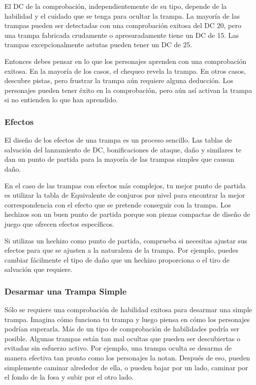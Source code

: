\documentclass[a4paper,twocolumn,openany,10pt]{dndbook}
\begin{document}
El DC de la comprobación, independientemente de su tipo, depende de la habilidad y el cuidado que se tenga para ocultar la
trampa. La mayoría de las trampas pueden ser detectadas con una comprobación exitosa del DC 20, pero una trampa fabricada
crudamente o apresuradamente tiene un DC de 15. Las trampas excepcionalmente astutas pueden tener un DC de 25.

Entonces debes pensar en lo que los personajes aprenden con una comprobación exitosa. En la mayoría de los casos, el chequeo
revela la trampa. En otros casos, descubre pistas, pero frustrar la trampa aún requiere alguna deducción. Los personajes pueden
tener éxito en la comprobación, pero aún así activan la trampa si no entienden lo que han aprendido. 

\subsubsection*{Efectos}
El diseño de los efectos de una trampa es un proceso sencillo. Las tablas de salvación del lanzamiento de DC, bonificaciones de
ataque, daño y similares te dan un punto de partida para la mayoría de las trampas simples que causan daño.

En el caso de las trampas con efectos más complejos, tu mejor punto de partida es utilizar la tabla de Equivalente de conjuros
por nivel para encontrar la mejor correspondencia con el efecto que se pretende conseguir con la trampa. Los hechizos son un buen
punto de partida porque son piezas compactas de diseño de juego que ofrecen efectos específicos.

Si utilizas un hechizo como punto de partida, comprueba si necesitas ajustar sus efectos para que se ajusten a la naturaleza de
la trampa. Por ejemplo, puedes cambiar fácilmente el tipo de daño que un hechizo proporciona o el tiro de salvación que requiere.

\subsubsection*{Desarmar una Trampa Simple}
Sólo se requiere una comprobación de habilidad exitosa para desarmar una simple trampa. Imagina cómo funciona tu trampa y luego
piensa en cómo los personajes podrían superarla. Más de un tipo de comprobación de habilidades podría ser posible. Algunas
trampas están tan mal ocultas que pueden ser descubiertas o evitadas sin esfuerzo activo. Por ejemplo, una trampa oculta se
desarma de manera efectiva tan pronto como los personajes la notan. Después de eso, pueden simplemente caminar alrededor de ella,
o pueden bajar por un lado, caminar por el fondo de la fosa y subir por el otro lado.
\end{document}

